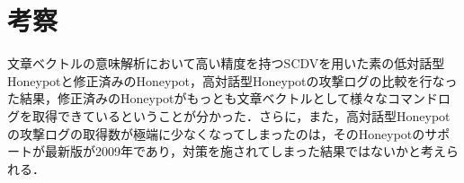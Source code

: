 \section{考察}
\label{eval:implkosatu}
文章ベクトルの意味解析において高い精度を持つ\cite{scdv}SCDVを用いた素の低対話型Honeypotと修正済みのHoneypot，高対話型Honeypotの攻撃ログの比較を行なった結果，修正済みのHoneypotがもっとも文章ベクトルとして様々なコマンドログを取得できているということが分かった．さらに，また，高対話型Honeypotの攻撃ログの取得数が極端に少なくなってしまったのは，そのHoneypotのサポートが最新版が2009年であり，対策を施されてしまった結果ではないかと考えられる．









